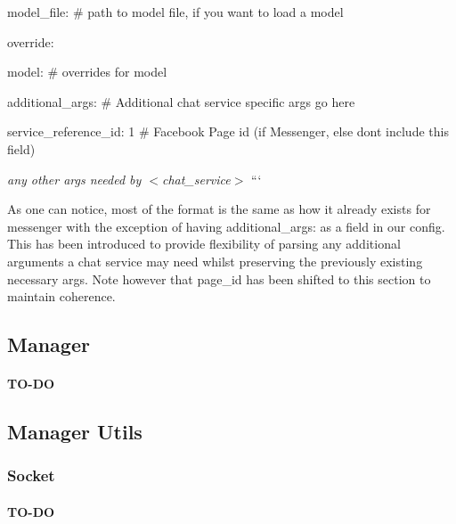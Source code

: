 \begin{DoxyItemize}
\begin{DoxyItemize}
\item model\+\_\+file\+: \# path to model file, if you want to load a model
\item override\+:
\begin{DoxyItemize}
\item model\+: \# overrides for model
\end{DoxyItemize}
\end{DoxyItemize}
\item additional\+\_\+args\+: \# Additional chat service specific args go here
\begin{DoxyItemize}
\item service\+\_\+reference\+\_\+id\+: 1 \# Facebook Page id (if Messenger, else don\textquotesingle{}t include this field)
\item {\itshape any other args needed by $<$chat\+\_\+service$>$} ```
\end{DoxyItemize}
\end{DoxyItemize}

As one can notice, most of the format is the same as how it already exists for messenger with the exception of having {\ttfamily additional\+\_\+args\+:} as a field in our config. This has been introduced to provide flexibility of parsing any additional arguments a chat service may need whilst preserving the previously existing necessary args. Note however that {\ttfamily page\+\_\+id} has been shifted to this section to maintain coherence.

\subsection*{Manager}

\paragraph*{T\+O-\/\+DO}

\subsection*{Manager Utils}

\subsubsection*{Socket}

\paragraph*{T\+O-\/\+DO}

